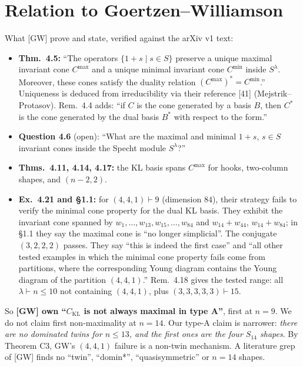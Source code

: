 \documentclass[11pt]{amsart}
\theoremstyle{definition}
\theoremstyle{remark}
\newcommand{\CKL}{C_{\mathrm{KL}}}
\begin{document}
\section{Relation to Goertzen--Williamson}\label{sec:gw}

What [GW] prove and state, verified against the arXiv v1 text:
\begin{itemize}[leftmargin=*,itemsep=2pt]
\item \textbf{Thm.~4.5:} ``The operators $\{1+s\mid s\in S\}$ preserve a unique maximal invariant cone $C^{\max}$ and a unique minimal invariant cone $C^{\min}$ inside $S^\lambda$. Moreover, these cones satisfy the duality relation $(C^{\max})^*=C^{\min}$.'' Uniqueness is deduced from irreducibility via their reference [41] (Mejstrik--Protasov). Rem.~4.4 adds: ``if $C$ is the cone generated by a basis $B$, then $C^*$ is the cone generated by the dual basis $B^*$ with respect to the form.''
\item \textbf{Question 4.6} (open): ``What are the maximal and minimal $1+s$, $s\in S$ invariant cones inside the Specht module $S^\lambda$?''
\item \textbf{Thms.~4.11, 4.14, 4.17:} the KL basis spans $C^{\max}$ for hooks, two-column shapes, and $(n-2,2)$.
\item \textbf{Ex.~4.21 and \S1.1:} for $(4,4,1)\vdash9$ (dimension $84$), their strategy fails to verify the minimal cone property for the dual KL basis. They exhibit the invariant cone spanned by $w_1,\dots,w_{13},w_{15},\dots,w_{84}$ and $w_{14}+w_{44}$, $w_{14}+w_{84}$; in \S1.1 they say the maximal cone is ``no longer simplicial''. The conjugate $(3,2,2,2)$ passes. They say ``this is indeed the first case'' and ``all other tested examples in which the minimal cone property fails come from partitions, where the corresponding Young diagram contains the Young diagram of the partition $(4,4,1)$.'' Rem.~4.18 gives the tested range: all $\lambda\vdash n\le10$ not containing $(4,4,1)$, plus $(3,3,3,3,3)\vdash15$.
\end{itemize}
So \textbf{[GW] own ``$\CKL$ is not always maximal in type A''}, first at $n=9$. We do not claim first non-maximality at $n=14$. Our type-A claim is narrower: \emph{there are no dominated twins for $n\le13$, and the first ones are the four $S_{14}$ shapes}. By Theorem C3, GW's $(4,4,1)$ failure is a non-twin mechanism. A literature grep of [GW] finds no ``twin'', ``domin*'', ``quasisymmetric'' or $n=14$ shapes.
\end{document}
